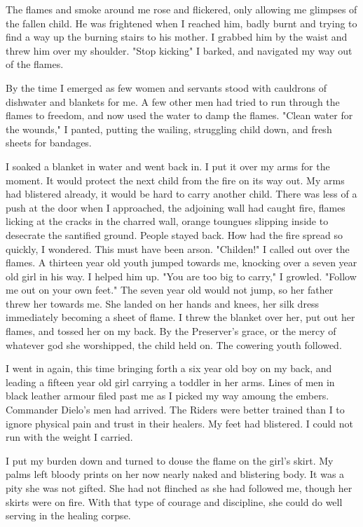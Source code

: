 \documentclass{article}
\begin{document}
The flames and smoke around me rose and flickered, only allowing me glimpses of the fallen child. He was frightened when I reached him, badly burnt and trying to find a way up the burning stairs to his mother. I grabbed him by the waist and threw him over my shoulder. "Stop kicking" I barked, and navigated my way out of the flames. 

By the time I emerged as few women and servants stood with cauldrons of dishwater and blankets for me. A few other men had tried to run through the flames to freedom, and now used the water to damp the flames. "Clean water for the wounds," I panted, putting the wailing, struggling child down, and fresh sheets for bandages. 

I soaked a blanket in water and went back in. I put it over my arms for the moment. It would protect the next child from the fire on its way out. My arms had blistered already, it would be hard to carry another child. There was less of a push at the door when I approached, the adjoining wall had caught fire, flames licking at the cracks in the charred wall, orange toungues slipping inside to desecrate the santified ground. People stayed back. How had the fire spread so quickly, I wondered. This must have been arson. "Childen!" I called out over the flames. A thirteen year old youth jumped towards me, knocking over a seven year old girl in his way. I helped him up. "You are too big to carry," I growled. "Follow me out on your own feet." The seven year old would not jump, so her father threw her towards me. She landed on her hands and knees, her silk dress immediately becoming a sheet of flame. I threw the blanket over her, put out her flames, and tossed her on my back. By the Preserver's grace, or the mercy of whatever god she worshipped, the child held on. The cowering youth followed.

I went in again, this time bringing forth a six year old boy on my back, and leading a fifteen year old girl carrying a toddler in her arms. Lines of men in black leather armour filed past me as I picked my way amoung the embers. Commander Dielo's men had arrived. The Riders were better trained than I to ignore physical pain and trust in their healers. My feet had blistered. I could not run with the weight I carried. 

I put my burden down and turned to douse the flame on the girl's skirt. My palms left bloody prints on her now nearly naked and blistering body. It was a pity she was not gifted. She had not flinched as she had followed me, though her skirts were on fire. With that type of courage and discipline, she could do well serving in the healing corpse.
\end{document}
